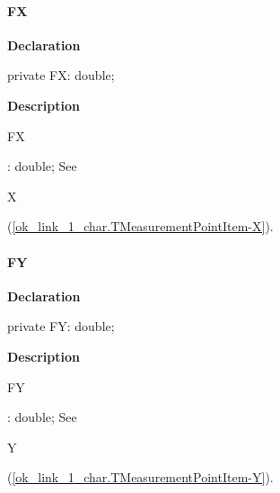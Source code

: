\documentclass{report}
\begin{document}
\paragraph*{FX}\hspace*{\fill}

\begin{list}{}{
\setlength{\itemindent}{0cm}
\setlength{\listparindent}{0cm}
\setlength{\leftmargin}{\evensidemargin}
\addtolength{\leftmargin}{\tmplength}
\settowidth{\labelsep}{X}
\addtolength{\leftmargin}{\labelsep}
\setlength{\labelwidth}{\tmplength}
}
\begin{flushleft}
\item[\textbf{Declaration}\hfill]
\begin{ttfamily}
private FX: double;\end{ttfamily}


\end{flushleft}
\par
\item[\textbf{Description}]
\begin{ttfamily}FX\end{ttfamily}: double; See \begin{ttfamily}X\end{ttfamily}(\ref{ok_link_1_char.TMeasurementPointItem-X}).

\end{list}
\paragraph*{FY}\hspace*{\fill}

\begin{list}{}{
\setlength{\itemindent}{0cm}
\setlength{\listparindent}{0cm}
\setlength{\leftmargin}{\evensidemargin}
\addtolength{\leftmargin}{\tmplength}
\settowidth{\labelsep}{X}
\addtolength{\leftmargin}{\labelsep}
\setlength{\labelwidth}{\tmplength}
}
\begin{flushleft}
\item[\textbf{Declaration}\hfill]
\begin{ttfamily}
private FY: double;\end{ttfamily}


\end{flushleft}
\par
\item[\textbf{Description}]
\begin{ttfamily}FY\end{ttfamily}: double; See \begin{ttfamily}Y\end{ttfamily}(\ref{ok_link_1_char.TMeasurementPointItem-Y}).

\end{list}
\end{document}

